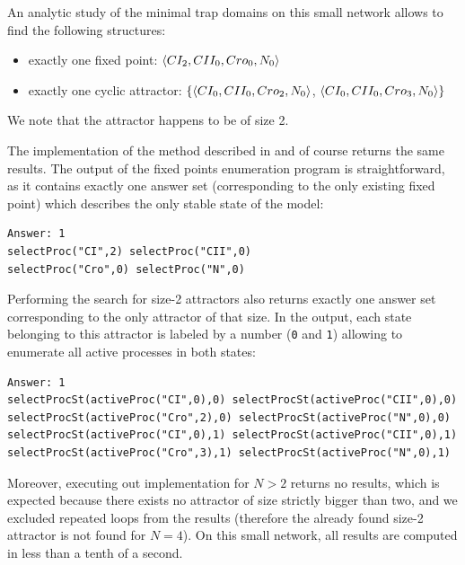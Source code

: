 An analytic study of the minimal trap domains on this small network
allows to find the following structures:
\begin{itemize}
  \item exactly one fixed point: $\mbox{$\langle CI_2, CII_0, Cro_0, N_0 \rangle$}$
  \item exactly one cyclic attractor: $\{ \mbox{$\langle CI_0, CII_0, Cro_2, N_0 \rangle$}$, $\mbox{$\langle CI_0, CII_0, Cro_3, N_0 \rangle$} \}$
\end{itemize}
We note that the attractor happens to be of size 2.

The implementation of the method described in  and 
of course returns the same results.
The output of the fixed points enumeration program is straightforward,
as it contains exactly one answer set (corresponding to the only existing fixed point) which describes the only stable state of the model:
\begin{lstlisting}[numbers=none]
Answer: 1
selectProc("CI",2) selectProc("CII",0)
selectProc("Cro",0) selectProc("N",0)
\end{lstlisting}
Performing the search for size-2 attractors also returns exactly one answer set corresponding to the only attractor of that size.
In the output, each state belonging to this attractor is labeled by a number (\texttt{0} and \texttt{1}) allowing to enumerate all active processes in both states:
\begin{lstlisting}[numbers=none]
Answer: 1
selectProcSt(activeProc("CI",0),0) selectProcSt(activeProc("CII",0),0)
selectProcSt(activeProc("Cro",2),0) selectProcSt(activeProc("N",0),0) 
selectProcSt(activeProc("CI",0),1) selectProcSt(activeProc("CII",0),1)
selectProcSt(activeProc("Cro",3),1) selectProcSt(activeProc("N",0),1)
\end{lstlisting}
Moreover, executing out implementation for $N>2$ returns no results,
which is expected because there exists no attractor of size strictly bigger than two, and we excluded repeated loops from the results (therefore the already found size-2 attractor is not found for $N=4$).
On this small network, all results are computed in less than a tenth of a second.

